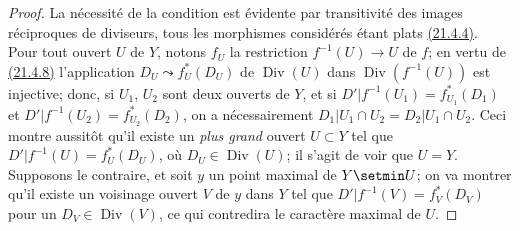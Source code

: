 \begin{proof}
La nécessité de la condition est évidente par transitivité des images
réciproques de diviseurs, tous les morphismes considérés étant plats
{\hyperlink{ega4.c04.statement.21-4-4}{(21.4.4)}}. Pour tout ouvert
$U$ de $Y$, notons $f_U$ la restriction $f^{-1}(U)\to U$ de $f$; en
vertu de {\hyperlink{ega4.c04.prop.21-4-8}{(21.4.8)}} l'application
$D_U\leadsto f_U^*(D_U)$
de $\operatorname{Div}(U)$ dans $\operatorname{Div}(f^{-1}(U))$ est
injective; donc, si $U_1$, $U_2$ sont deux ouverts de $Y$, et si
$D'|f^{-1}(U_1)=f_{U_1}^*(D_1)$ et
$D'|f^{-1}(U_2)=f_{U_2}^*(D_2)$,
on a nécessairement
$D_1|U_1\cap U_2=D_2|U_1\cap U_2$. Ceci montre aussitôt qu'il existe
un \emph{plus grand} ouvert $U\subset Y$ tel que
$D'|f^{-1}(U)=f_U^*(D_U)$, où $D_U\in\operatorname{Div}(U)$;
il s'agit de voir que $U=Y$. Supposons le contraire, et soit $y$ un
point maximal de $Y\setmin U$; on va montrer qu'il existe un voisinage ouvert
$V$ de $y$ dans $Y$ tel que
$D'|f^{-1}(V)=f_V^*(D_V)$ pour un $D_V\in\operatorname{Div}(V)$, ce qui
contredira le caractère maximal de $U$.


\end{proof}
